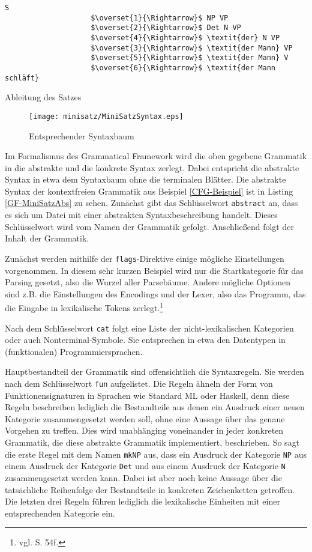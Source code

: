 \documentclass[12pt,abstract=on,titlepage,bibliography=totoc,ngerman,listof=totoc]{scrreprt}
\begin{document}
\begin{program}[h]
\begin{Verbatim}[commandchars=\\\{\},codes={\catcode`$=3\catcode`^=7}] 
                    S
                    $\overset{1}{\Rightarrow}$ NP VP
                    $\overset{2}{\Rightarrow}$ Det N VP
                    $\overset{4}{\Rightarrow}$ \textit{der} N VP
                    $\overset{3}{\Rightarrow}$ \textit{der Mann} VP
                    $\overset{5}{\Rightarrow}$ \textit{der Mann} V
                    $\overset{6}{\Rightarrow}$ \textit{der Mann schläft}
\end{Verbatim}
\caption{Ableitung des Satzes}
\label{CFG-Ableitung}
\end{program}
\begin{figure}[h]
\texttt{[image: minisatz/MiniSatzSyntax.eps]}
\caption{Entsprechender Syntaxbaum}\label{CFG-Syntaxbaum}
\end{figure}
Im Formalismus des Grammatical Framework wird die oben gegebene Grammatik in die abstrakte und die konkrete Syntax zerlegt.
Dabei entspricht die abstrakte Syntax in etwa dem Syntaxbaum ohne die terminalen Blätter. Die abstrakte Syntax der kontextfreien Grammatik aus Beispiel \ref{CFG-Beispiel} ist in Listing \ref{GF-MiniSatzAbs} zu sehen. Zunächst gibt das Schlüsselwort \texttt{abstract} an, dass es sich um Datei mit einer abstrakten Syntaxbeschreibung handelt. Dieses Schlüsselwort wird vom Namen der Grammatik gefolgt. Anschließend folgt der Inhalt der Grammatik. \par
Zunächst werden mithilfe der \texttt{flags}-Direktive einige mögliche Einstellungen vorgenommen. In diesem sehr kurzen Beispiel wird nur die Startkategorie für das Parsing gesetzt, also die Wurzel aller Parsebäume. Andere mögliche Optionen sind z.B. die Einstellungen des Encodings und der Lexer, also das Programm, das die Eingabe in lexikalische Tokens zerlegt.\footnote{vgl. \cite{RANTA2011} S. 54f.} \par
Nach dem Schlüsselwort \texttt{cat} folgt eine Liste der nicht-lexikalischen Kategorien oder auch Nonterminal-Symbole. Sie entsprechen in etwa den Datentypen in (funktionalen) Programmiersprachen. \par
Hauptbestandteil der Grammatik sind offensichtlich die Syntaxregeln. Sie werden nach dem Schlüsselwort \texttt{fun} aufgelistet. Die Regeln ähneln der Form von Funktionensignaturen in Sprachen wie Standard ML oder Haskell, denn diese Regeln beschreiben lediglich die Bestandteile aus denen ein Ausdruck einer neuen Kategorie zusammengesetzt werden soll, ohne eine Aussage über das genaue Vorgehen zu treffen. Dies wird unabhänging voneinander in jeder konkreten Grammatik, die diese abstrakte Grammatik implementiert, beschrieben. So sagt die erste Regel mit dem Namen \texttt{mkNP} aus, dass ein Ausdruck der Kategorie \texttt{NP} aus einem Ausdruck der Kategorie \texttt{Det} und aus einem Ausdruck der Kategorie \texttt{N} zusammengesetzt werden kann. Dabei ist aber noch keine Aussage über die tatsächliche Reihenfolge der Bestandteile in konkreten Zeichenketten getroffen. Die letzten drei Regeln führen lediglich die lexikalische Einheiten mit einer entsprechenden Kategorie ein. \par
\end{document}
